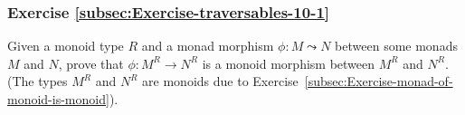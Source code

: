 \subsubsection{Exercise \label{subsec:Exercise-traversables-10-1}\ref{subsec:Exercise-traversables-10-1}}

Given a monoid type $R$ and a monad morphism $\phi:M\leadsto N$
between some monads $M$ and $N$, prove that $\phi:M^{R}\rightarrow N^{R}$
is a monoid morphism between $M^{R}$ and $N^{R}$. (The types $M^{R}$
and $N^{R}$ are monoids due to Exercise~\ref{subsec:Exercise-monad-of-monoid-is-monoid}).

\begin{comment}
Solution

The empty elements of the monoids $M^{R}$ and $N^{R}$ (by definition)
are $\text{pu}_{M}(e_{R})$ and $\text{pu}_{N}(e_{R})$ respectively.
The binary operations of $M^{R}$ and $N^{R}$ are
\begin{align*}
 & p\underset{M^{R}}{\oplus}q\triangleq p\triangleright\text{flm}_{M}\big(u^{:R}\rightarrow q\triangleright(v^{:R}\rightarrow u\oplus_{R}v)^{\uparrow M}\big)\quad,\\
 & p\underset{N^{R}}{\oplus}q\triangleq p\triangleright\text{flm}_{N}\big(u^{:R}\rightarrow q\triangleright(v^{:R}\rightarrow u\oplus_{R}v)^{\uparrow N}\big)\quad.
\end{align*}
To verify the properties of a monoid morphism, begin with the identity
law:
\begin{align*}
{\color{greenunder}\text{expect to equal }e_{N^{R}}:}\quad & \gunderline{e_{M^{R}}}\triangleright\phi=\gunderline{e_{R}\triangleright\text{pu}_{M}}\triangleright\phi=e_{R}\triangleright\text{pu}_{N}=e_{N^{R}}\quad.
\end{align*}
Now check the composition law: for any $p^{:M^{R}}$ and $q^{:M^{R}}$,
\begin{align*}
{\color{greenunder}\text{expect to equal }(p\underset{M^{R}}{\oplus}q)\triangleright\phi:}\quad & (p\triangleright\phi)\underset{N^{R}}{\oplus}(q\triangleright\phi)=(p\triangleright\phi)\triangleright\text{flm}_{N}\big(u\rightarrow q\triangleright\gunderline{\phi\triangleright(v\rightarrow u\oplus_{R}v)^{\uparrow N}}\big)\\
{\color{greenunder}\text{naturality of }\phi:}\quad & =p\triangleright\gunderline{\phi\bef\big(u\rightarrow q\triangleright(v\rightarrow u\oplus_{R}v)^{\uparrow M}\bef\phi\big)^{\uparrow N}}\bef\text{ftn}_{N}\\
{\color{greenunder}\text{naturality of }\phi:}\quad & =p\triangleright\big(u\rightarrow q\triangleright(v\rightarrow u\oplus_{R}v)^{\uparrow M}\big)^{\uparrow M}\bef\gunderline{\phi\bef\phi^{\uparrow N}\bef\text{ftn}_{N}}\\

\end{comment}
